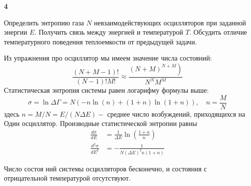 \documentclass[a4paper,12pt]{article} %
\begin{document}
\begin{ttask}\textbf{4}

Определить энтропию газа $ N $ невзаимодействующих осцилляторов при заданной энергии $ E$. 
Получить связь между энергией и температурой $ T$.
Обсудить отличие температурного поведения теплоемкости от предыдущей задачи.

Из упражнения про осциллятор мы имеем значение числа состояний:
$$
\frac{(N+M-1) !}{(N-1) ! M !} \approx \frac{\left.(N+M)^{N+M}\right)}{N^{N} M^{M}}
$$
Статистическая энтропия системы равен логарифму формулы выше:
$$
\sigma=\ln \Delta \Gamma=N(-n \ln (n)+(1+n) \ln (1+n)), \quad n=\frac{M}{N}
$$
здесь $n=M / N=E /(N \Delta E)-$ среднее число возбуждений, приходящихся на Один осциллятор.
Производные статистической энтропии равны
$$
\begin{aligned}
\frac{d \sigma}{d E} &=\frac{1}{\Delta E} \ln \left(\frac{1+n}{n}\right) \\
\frac{d^{2} \sigma}{d E^{2}} &=-\frac{1}{N(\Delta E)^{2} n(1+n)}
\end{aligned}
$$

Число состоя ний системы осцилляторов бесконечно, и состояния с отрицательной температурой отсутствуют.





\end{ttask}
\end{document}
